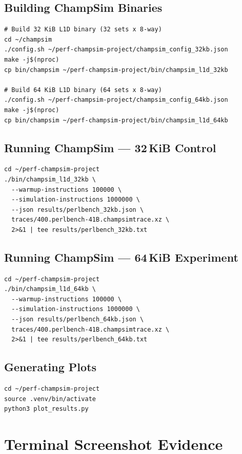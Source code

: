 \documentclass[11pt,a4paper]{article}
\begin{document}
\subsection{Building ChampSim Binaries}
\begin{lstlisting}
# Build 32 KiB L1D binary (32 sets x 8-way)
cd ~/champsim
./config.sh ~/perf-champsim-project/champsim_config_32kb.json
make -j$(nproc)
cp bin/champsim ~/perf-champsim-project/bin/champsim_l1d_32kb

# Build 64 KiB L1D binary (64 sets x 8-way)
./config.sh ~/perf-champsim-project/champsim_config_64kb.json
make -j$(nproc)
cp bin/champsim ~/perf-champsim-project/bin/champsim_l1d_64kb
\end{lstlisting}

\subsection{Running ChampSim — 32\,KiB Control}
\begin{lstlisting}
cd ~/perf-champsim-project
./bin/champsim_l1d_32kb \
  --warmup-instructions 100000 \
  --simulation-instructions 1000000 \
  --json results/perlbench_32kb.json \
  traces/400.perlbench-41B.champsimtrace.xz \
  2>&1 | tee results/perlbench_32kb.txt
\end{lstlisting}

\subsection{Running ChampSim — 64\,KiB Experiment}
\begin{lstlisting}
cd ~/perf-champsim-project
./bin/champsim_l1d_64kb \
  --warmup-instructions 100000 \
  --simulation-instructions 1000000 \
  --json results/perlbench_64kb.json \
  traces/400.perlbench-41B.champsimtrace.xz \
  2>&1 | tee results/perlbench_64kb.txt
\end{lstlisting}

\subsection{Generating Plots}
\begin{lstlisting}
cd ~/perf-champsim-project
source .venv/bin/activate
python3 plot_results.py
\end{lstlisting}

\section{Terminal Screenshot Evidence}
\end{document}
